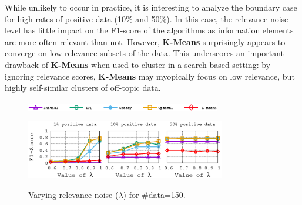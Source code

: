 While unlikely to occur in practice, it is interesting to analyze the boundary case for high rates of positive data (10\% and 50\%).  In this case, the relevance noise level has little impact on the F1-score of the algorithms as information elements are more often relevant than not.  However, {\bf $\mathbf{K}$-Means} surprisingly appears to converge on low relevance subsets of the data.  This underscores an important drawback of {\bf $\mathbf{K}$-Means} when used to cluster in a search-based setting: by ignoring relevance scores, {\bf $\mathbf{K}$-Means} may myopically focus on low relevance, but highly self-similar clusters of off-topic data.



\begin{figure}[H]
\begin{centering}
\includegraphics[width=8.5cm]{imgs/legend1}
\par\end{centering}
\begin{centering}
{\includegraphics[width=8.7cm]{imgs/Twitter_results/f1_performance_posrate_Data_150}}\par\end{centering}
\caption{Varying relevance noise ($\lambda$) for \#data=150.}
\label{fig:F1_vs_Lambda}
\end{figure}







